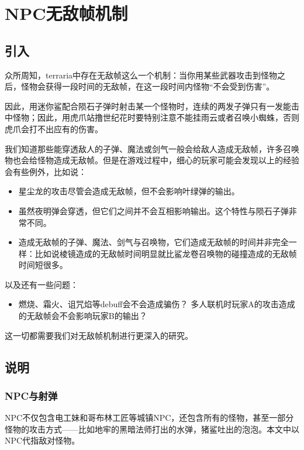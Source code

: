 \chapter{NPC无敌帧机制}

\section{引入}

众所周知，terraria中存在无敌帧这么一个机制：当你用某些武器攻击到怪物之后，怪物会获得一段时间的无敌帧，在这一段时间内怪物“不会受到伤害”。

因此，用迷你鲨配合陨石子弹时射击某一个怪物时，连续的两发子弹只有一发能击中怪物；因此，用虎爪站撸世纪花时要特别注意不能挂雨云或者召唤小蜘蛛，否则虎爪会打不出应有的伤害。

我们知道那些能穿透敌人的子弹、魔法或剑气一般会给敌人造成无敌帧，许多召唤物也会给怪物造成无敌帧。但是在游戏过程中，细心的玩家可能会发现以上的经验会有些例外，比如说：

\begin{itemize}
\item 星尘龙的攻击尽管会造成无敌帧，但不会影响叶绿弹的输出。
\item 虽然夜明弹会穿透，但它们之间并不会互相影响输出。这个特性与陨石子弹非常不同。
\item 造成无敌帧的子弹、魔法、剑气与召唤物，它们造成无敌帧的时间并非完全一样：比如说棱镜造成的无敌帧时间明显就比鲨龙卷召唤物的碰撞造成的无敌帧时间短很多。
\end{itemize}

以及还有一些问题：

\begin{itemize}
\item 燃烧、霜火、诅咒焰等debuff会不会造成骗伤？
\ietm 多人联机时玩家A的攻击造成的无敌帧会不会影响玩家B的输出？
\end{itemize}

这一切都需要我们对无敌帧机制进行更深入的研究。

\section{说明}

\subsection{NPC与射弹}

NPC不仅包含电工妹和哥布林工匠等城镇NPC，还包含所有的怪物，甚至一部分怪物的攻击方式——比如地牢的黑暗法师打出的水弹，猪鲨吐出的泡泡。本文中以NPC代指敌对怪物。

